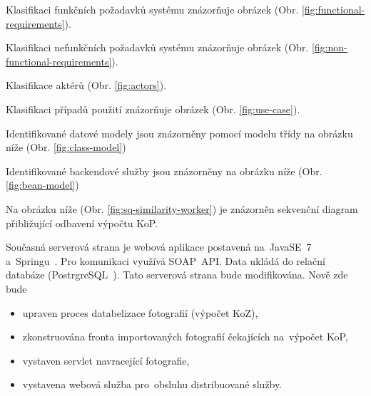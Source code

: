 


Klasifikaci funkčních požadavků systému znázorňuje obrázek (Obr. \ref{fig:functional-requirements}).

Klasifikaci nefunkčních požadavků systému znázorňuje obrázek (Obr. \ref{fig:non-functional-requirements}).



Klasifikace aktérů (Obr. \ref{fig:actors}).

Klasifikaci případů použití znázorňuje obrázek (Obr. \ref{fig:use-case}).



Identifikované datové modely jsou znázorněny pomocí modelu třídy na obrázku níže (Obr. \ref{fig:class-model})

Identifikované backendové služby jsou znázorněny na obrázku níže (Obr. \ref{fig:bean-model})


Na obrázku níže (Obr. \ref{fig:sq-similarity-worker}) je znázorněn sekvenční diagram přibližující odbavení výpočtu KoP.



Současná serverová strana je webová aplikace postavená na~JavaSE~7~\cite{java-se} a~Springu~\cite{spring}. Pro komunikaci využívá SOAP~API. Data ukládá do relační databáze (PostrgreSQL~\cite{postresql}). Tato serverová strana bude modifikována. Nově zde bude
\begin{itemize}
	\setlength{\parskip}{0pt}
	\setlength{\itemsep}{0pt}
	\item {upraven proces databelizace fotografií (výpočet KoZ),}
	\item {zkonstruována fronta importovaných fotografií čekajících na~výpočet KoP,}
	\item {vystaven servlet navracející fotografie,}
	\item {vystavena webová služba pro~obsluhu distribuované služby.}
\end{itemize}


